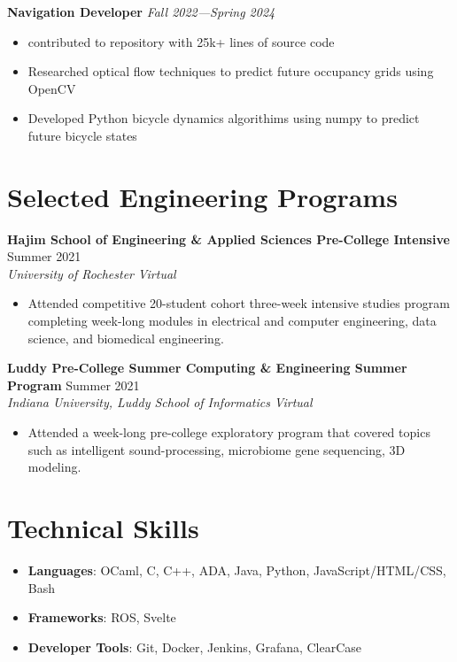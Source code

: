\documentclass[letterpaper,8pt]{article}
\newcommand{\position}[2]{
    \vspace{4pt}
    \normalsize \textbf {#1}
    \hfill {\small \textit{#2}}
    \\
}
\newcommand{\resumeEntry}[4]{
    \vspace{4pt}
    \large \textbf{#1}
    \normalsize \hfill #2
    \\
    \textit{#3} \hfill \textit{#4}
    \vspace{1pt}
}
\newcommand{\itemsBegin}{
    \begin{itemize}[leftmargin=0.2in, labelsep=0.05in, itemsep=0pt, parsep=1pt, topsep=0pt, partopsep=0pt]
}
\newcommand{\itemsEnd}{\end{itemize}}
\begin{document}
    \position{Navigation Developer}{Fall 2022---Spring 2024}
    \itemsBegin
        \item contributed to repository with 25k+ lines of source code
        \item Researched optical flow techniques to predict future occupancy grids using OpenCV
        \item Developed Python bicycle dynamics algorithims using numpy to predict future bicycle states
    \itemsEnd

\section{Selected Engineering Programs}


    \resumeEntry
        {Hajim School of Engineering \& Applied Sciences Pre-College Intensive}
        {Summer 2021}
        {University of Rochester}
        {Virtual}

    \itemsBegin
        \item Attended competitive 20-student cohort three-week intensive studies program completing week-long modules in electrical and computer engineering, data science, and biomedical engineering.
    \itemsEnd

    \resumeEntry
        {Luddy Pre-College Summer Computing \& Engineering Summer Program}
        {Summer 2021}
        {Indiana University, Luddy School of Informatics}
        {Virtual}

    \itemsBegin
        \item Attended a week-long pre-college exploratory program that covered topics such as intelligent sound-processing, microbiome gene sequencing, 3D modeling.
    \itemsEnd

\section{Technical Skills}

    \itemsBegin
        \item \textbf{Languages}{: OCaml, C, C++, ADA, Java, Python, JavaScript/HTML/CSS, Bash}
        \item \textbf{Frameworks}{: ROS, Svelte}
        \item \textbf{Developer Tools}{: Git, Docker, Jenkins, Grafana, ClearCase}
    \itemsEnd

\end{document}
